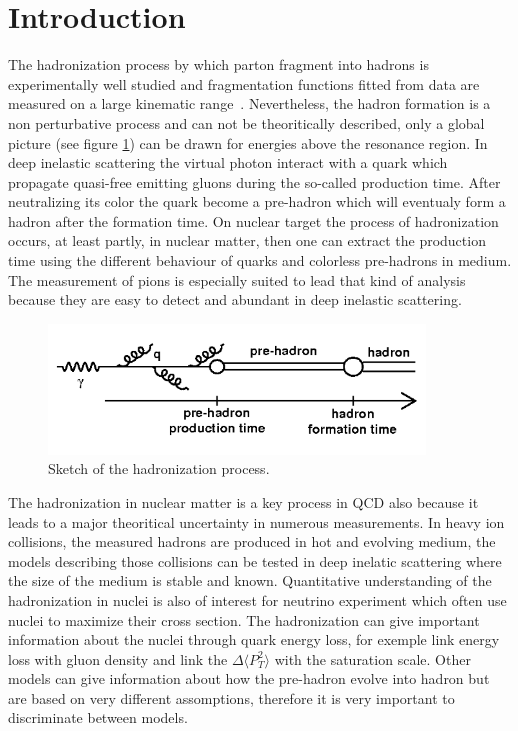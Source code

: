 
\section{Introduction}
\label{physics}

The hadronization process by which parton fragment into hadrons is 
experimentally well studied and fragmentation functions fitted from 
data are measured on a large kinematic range~\cite{Albino:2008fy}.
Nevertheless, the hadron formation is a non perturbative process and can not 
be theoritically described, only a global picture 
(see figure \ref{fig:hadro}) can be drawn for
energies above the resonance region. In deep inelastic scattering the
virtual photon interact with a quark which propagate quasi-free emitting
gluons during the 
so-called production time. After neutralizing its color the quark become 
a pre-hadron which will eventualy form a hadron after the formation time.
On nuclear target the process of hadronization occurs, at least partly, in 
nuclear matter, then one can extract the production time using the different 
behaviour of quarks and colorless pre-hadrons in medium. The measurement of
pions is especially suited to lead that kind of analysis because they are easy
to detect and abundant in deep inelastic scattering.

\begin{figure}[htbp]
\centering
\includegraphics[width=10cm] {fig/hadro.png} 
\caption {Sketch of the hadronization process.}
\label{fig:hadro}
\end{figure}

The hadronization in nuclear matter is a key process in QCD also
because it leads to a major theoritical uncertainty in numerous measurements.
In heavy ion collisions, the measured hadrons are produced in hot and evolving 
medium, the models describing those collisions can be tested in deep inelatic scattering 
where the size of the medium is stable and known. Quantitative
understanding of the hadronization in nuclei is also of interest for
neutrino experiment which often use nuclei to maximize their cross section.
The hadronization can give important information about the 
nuclei through quark energy loss, for exemple \cite{Arleo:2003yf} link 
energy loss with gluon density and \cite{Kopeliovich:2010aa} link the $\Delta \langle
P_T^2 \rangle$ with the saturation scale. Other models \cite{Gallmeister:2007an}
can give information about how the pre-hadron evolve into hadron but are based
on very different assomptions, therefore it is very important to discriminate between
models. 

